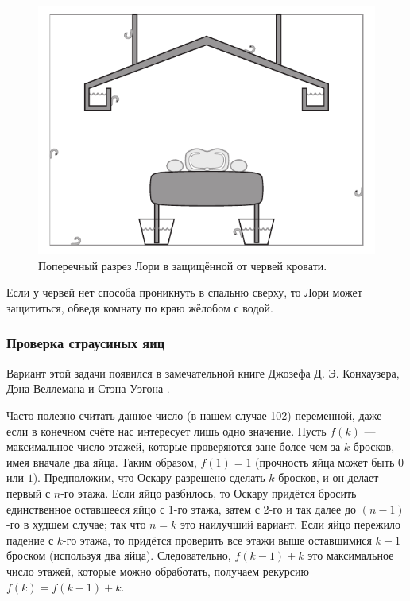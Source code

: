 \begin{figure}[h!]
\centering
\includegraphics[scale=0.5]{pics/chervi}
\caption{Поперечный разрез Лори в защищённой от червей кровати.}
\label{pic:chervi}
\end{figure}

Если у червей нет способа проникнуть в спальню сверху, то Лори может защититься, обведя комнату по краю жёлобом с водой.

\subsubsection*{Проверка страусиных яиц}

Вариант этой задачи появился в замечательной книге Джозефа Д. Э. Конхаузера, Дэна Веллемана и Стэна Уэгона \cite{42}.

Часто полезно считать данное число (в нашем случае 102) переменной, даже если в конечном счёте нас интересует лишь одно значение.
Пусть $f(k)$ --- максимальное число этажей, которые проверяются зане более чем за $k$ бросков, имея вначале два яйца.
Таким образом, $f(1) = 1$ (прочность яйца может быть $0$ или $1$).
Предположим, что Оскару разрешено сделать $k$ бросков, и он делает первый с $n$-го этажа.
Если яйцо разбилось, то Оскару придётся бросить единственное оставшееся яйцо с 1-го этажа, затем с 2-го и так далее до $(n-1)$-го в худшем случае;
так что $n = k$ это наилучший вариант.
Если яйцо пережило падение с $k$-го этажа, то придётся проверить все этажи выше оставшимися $k-1$ броском (используя два яйца).
Следовательно, $f(k - 1) + k$ это максимальное число этажей, которые можно обработать,
получаем рекурсию $f(k) = f(k - 1) + k$.

